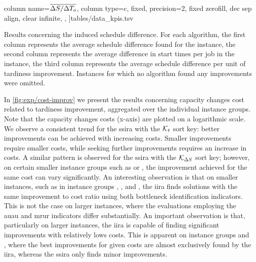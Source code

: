 \begin{table}[p]
{            column name=$\overline{\Delta S_{} / \Delta T_{o}}$,
            column type=c,
            fixed, precision=2,
            fixed zerofill,
            dec sep align,
            clear infinite,
            },
    ]{tables/data_kpis.tsv}
    \caption{
        Results concerning the induced schedule difference.
        For each algorithm, the first column represents the average schedule difference found for the instance,
        the second column represents the average difference in start times per job in the instance,
        the third column represents the average schedule difference per unit of tardiness improvement.
        Instances for which no algorithm found any improvements were omitted.
        }
    \label{tab:exp/kpis-difference}
\end{table}

In \cref{fig:exp/cost-improv} we present the results concerning
capacity changes cost related to tardiness improvement, aggregated over the individual instance groups.
Note that the capacity changes costs (x-axis) are plotted on a logarithmic scale.
We observe a consistent trend for the \ac{ssira} with the $\mathcal{K}_{t}$ sort key:
better improvements can be achieved with increasing costs.
Smaller improvements require smaller costs,
while seeking further improvements requires an increase in costs.
A similar pattern is observed for the \ac{ssira} with the $\mathcal{K}_{\Delta S_{}}$ sort key;
however, on certain smaller instance groups such as  or ,
the improvement achieved for the same cost can vary significantly.
An interesting observation is that on smaller instances,
such as in instance groups , , and ,
the \ac{iira} finds solutions with the same improvement to cost ratio
using both bottleneck identification indicators.
This is not the case on larger instances,
where the evaluations employing the \ac{auau} and \ac{mrur} indicators differ substantially.
An important observation is that, particularly on larger instances,
the \ac{iira} is capable of finding significant improvements with relatively lows costs.
This is apparent on instance groups  and ,
where the best improvements for given costs are almost exclusively found by the \ac{iira},
whereas the \ac{ssira} only finds minor improvements.

